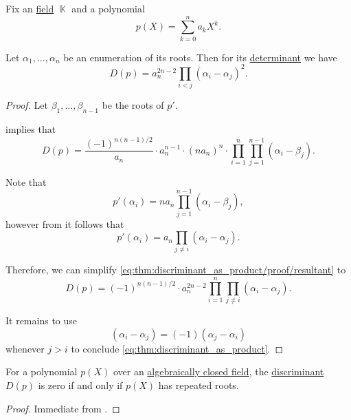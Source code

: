 \begin{proposition}\label{thm:discriminant_as_product}
  Fix an \hyperref[def:algebraically_closed_field]{} \hyperref[def:field]{field} \( \BbbK \) and a polynomial
  \begin{equation*}
    p(X) = \sum_{k=0}^n a_k X^k.
  \end{equation*}

  Let \( \alpha_1, \ldots, \alpha_n \) be an enumeration of its roots. Then for its \hyperref[def:determinant]{determinant} we have
  \begin{equation}\label{eq:thm:resultant_as_product}
    D(p) = a_n^{2n - 2} \prod_{i < j} (\alpha_i - \alpha_j)^2.
  \end{equation}
\end{proposition}
\begin{proof}
  Let \( \beta_1, \ldots, \beta_{n-1} \) be the roots of \( p' \).

   implies that
  \begin{equation}\label{eq:thm:discriminant_as_product/proof/resultant}
    D(p) = \frac {(-1)^{n(n-1)/2}} {a_n} \cdot a_n^{n-1} \cdot (n a_n)^n \cdot \prod_{i=1}^n \prod_{j=1}^{n-1} (\alpha_i - \beta_j).
  \end{equation}

  Note that
  \begin{equation*}
    p'(\alpha_i) = n a_n \prod_{j=1}^{n-1} (\alpha_i - \beta_j),
  \end{equation*}
  however from  it follows that
  \begin{equation*}
    p'(\alpha_i) = a_n \prod_{j \neq i} (\alpha_i - \alpha_j).
  \end{equation*}

  Therefore, we can simplify \eqref{eq:thm:discriminant_as_product/proof/resultant} to
  \begin{equation*}
    D(p) = (-1)^{n(n-1)/2} \cdot a_n^{2n-2} \prod_{i=1}^n \prod_{j \neq i} (\alpha_i - \alpha_j).
  \end{equation*}

  It remains to use
  \begin{equation*}
    (\alpha_i - \alpha_j) = (-1)(\alpha_j - \alpha_i)
  \end{equation*}
  whenever \( j > i \) to conclude \eqref{eq:thm:discriminant_as_product}.
\end{proof}

\begin{corollary}\label{thm:discriminant_invertibility}
  For a polynomial \( p(X) \) over an \hyperref[def:algebraically_closed_field]{algebraically closed field}, the \hyperref[def:discriminant]{discriminant} \( D(p) \) is zero if and only if \( p(X) \) has repeated roots.
\end{corollary}
\begin{proof}
  Immediate from .
\end{proof}

